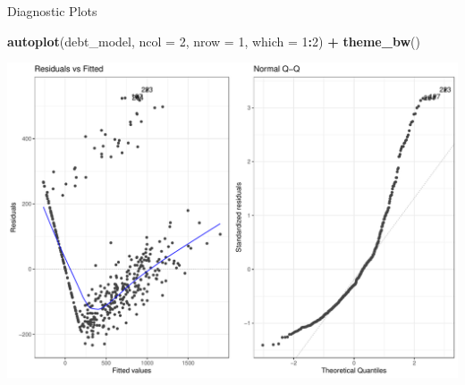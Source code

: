 \documentclass[
  ignorenonframetext,
]{beamer}
\newenvironment{Shaded}{\begin{snugshade}}{\end{snugshade}}
\newcommand{\AttributeTok}[1]{\textcolor[rgb]{0.13,0.29,0.53}{#1}}
\newcommand{\DecValTok}[1]{\textcolor[rgb]{0.00,0.00,0.81}{#1}}
\newcommand{\FunctionTok}[1]{\textcolor[rgb]{0.13,0.29,0.53}{\textbf{#1}}}
\newcommand{\NormalTok}[1]{#1}
\newcommand{\SpecialCharTok}[1]{\textcolor[rgb]{0.81,0.36,0.00}{\textbf{#1}}}
\begin{document}
\begin{frame}[fragile]{Diagnostic Plots}
\protect\hypertarget{diagnostic-plots-1}{}
\normalsize

\begin{Shaded}
\begin{Highlighting}[]
\FunctionTok{autoplot}\NormalTok{(debt\_model, }\AttributeTok{ncol =} \DecValTok{2}\NormalTok{, }\AttributeTok{nrow =} \DecValTok{1}\NormalTok{, }\AttributeTok{which =} \DecValTok{1}\SpecialCharTok{:}\DecValTok{2}\NormalTok{) }\SpecialCharTok{+} 
  \FunctionTok{theme\_bw}\NormalTok{()}
\end{Highlighting}
\end{Shaded}

\begin{center}\includegraphics[width=0.8\linewidth,height=0.5\textheight]{Week5_Lect_files/figure-beamer/unnamed-chunk-47-1} \end{center}
\normalsize
\end{frame}
\end{document}
